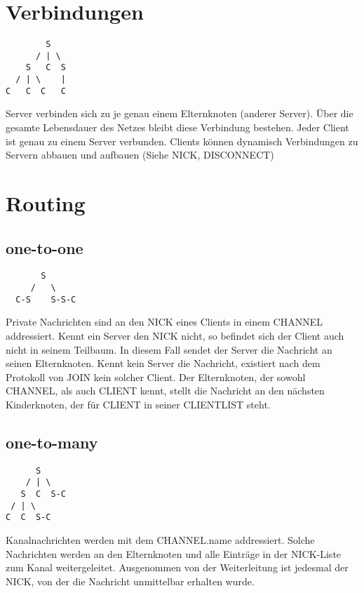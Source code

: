 \documentclass{article}
\begin{document}
\section{Verbindungen}

\begin{lstlisting}
        S
      / | \
    S   C  S
  / | \    |
C   C  C   C
\end{lstlisting}

Server verbinden sich zu je genau einem Elternknoten (anderer Server). Über die gesamte Lebensdauer des Netzes bleibt diese Verbindung bestehen.
Jeder Client ist genau zu einem Server verbunden.
Clients können dynamisch Verbindungen zu Servern abbauen und aufbauen (Siehe NICK, DISCONNECT)


\section{Routing}

\subsection{one-to-one}

\begin{lstlisting}
       S
     /   \
  C-S    S-S-C
\end{lstlisting}

Private Nachrichten sind an den NICK eines Clients in einem CHANNEL addressiert. Kennt ein Server den NICK nicht, so befindet sich der Client auch nicht in seinem Teilbaum. In diesem Fall sendet der Server die Nachricht an seinen Elternknoten. Kennt kein Server die Nachricht, existiert nach dem Protokoll von JOIN kein solcher Client. Der Elternknoten, der sowohl CHANNEL, als auch CLIENT kennt, stellt die Nachricht an den nächsten Kinderknoten, der für CLIENT in seiner CLIENTLIST steht.

\subsection{one-to-many}

\begin{lstlisting}
      S
    / | \
   S  C  S-C
 / | \
C  C  S-C
\end{lstlisting}

Kanalnachrichten werden mit dem CHANNEL.name addressiert. Solche Nachrichten werden an den Elternknoten und alle Einträge in der NICK-Liste zum Kanal weitergeleitet. Ausgenommen von der Weiterleitung ist jedesmal der NICK, von der die Nachricht unmittelbar erhalten wurde.
\end{document}
